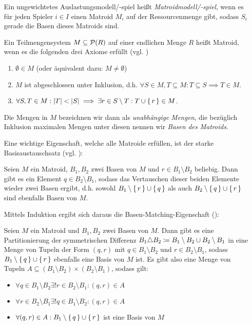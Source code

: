 \begin{defn}
	Ein ungewichtetes Auslastungsmodell/-spiel heißt \emph{Matroidmodell/-spiel}, wenn es für jeden Spieler $i \in I$ einen Matroid $M_i$ auf der Ressourcenmenge gibt, sodass $S_i$ gerade die Basen dieses Matroids sind.
\end{defn}

\begin{defn}
	Ein Teilmengensystem $M \subseteq \mathcal{P}(R)$ auf einer endlichen Menge $R$ heißt Matroid, wenn es die folgenden drei Axiome erfüllt (vgl. \cite[Abschnitt 39.1]{CombOptMatroide})
	\begin{enumerate}
		\item $\emptyset \in M$ (oder äquivalent dazu: $M \neq \emptyset$)
		\item $M$ ist abgeschlossen unter Inklusion, d.h. $\forall S \in M, T \subseteq M: T \subseteq S \implies T \in M$.
		\item $\forall S, T \in M: \left|T\right| < \left|S\right| \implies \exists r \in S \setminus T: T \cup \set{r} \in M$.
	\end{enumerate}
	Die Mengen in $M$ bezeichnen wir dann als \emph{unabhängige Mengen}, die bezüglich Inklusion maximalen Mengen unter diesen nennen wir \emph{Basen des Matroids}.
\end{defn}

Eine wichtige Eigenschaft, welche alle Matroide erfüllen, ist der starke Basisaustauschsatz (vgl. \cite[Theorem 29.12]{CombOptMatroide}):

\begin{satz}
	Seien $M$ ein Matroid, $B_1, B_2$ zwei Basen von $M$ und $r \in B_1 \setminus B_2$ beliebig. Dann gibt es ein Element $q \in B_2 \setminus B_1$, sodass das Vertauschen dieser beiden Elemente wieder zwei Basen ergibt, d.h. sowohl $B_1 \setminus \set{r} \cup \set{q}$ als auch $B_2 \setminus \set{q} \cup \set{r}$ sind ebenfalls Basen von $M$.
\end{satz}

Mittels Induktion ergibt sich daraus die Basen-Matching-Eigenschaft (\cite[Korollar 39.12a]{CombOptMatroide}):

\begin{kor}\label{kor:BasenMatchingEig}
	Seien $M$ ein Matroid und $B_1, B_2$ zwei Basen von $M$. Dann gibt es eine Partitionierung der symmetrischen Differenz $B_1 \triangle B_2 \coloneqq B_1 \setminus B_2 \cup B_2 \setminus B_1$ in eine Menge von Tupeln der Form $(q,r)$ mit $q \in B_1\setminus B_2$ und $r \in B_2 \setminus B_1$, sodass $B_1 \setminus \set{q} \cup \set{r}$ ebenfalls eine Basis von $M$ ist. Es gibt also eine Menge von Tupeln $A \subseteq (B_1 \setminus B_2) \times (B_2 \setminus B_1)$, sodass gilt:
	\begin{itemize}
		\item $\forall q \in B_1 \setminus B_2 \exists! r \in B_2 \setminus B_1: (q,r) \in A$
		\item $\forall r \in B_2 \setminus B_1 \exists! q \in B_1 \setminus B_2: (q,r) \in A$
		\item $\forall (q,r) \in A: B_1 \setminus \set{q} \cup \set{r}$ ist eine Basis von $M$
	\end{itemize}
\end{kor}